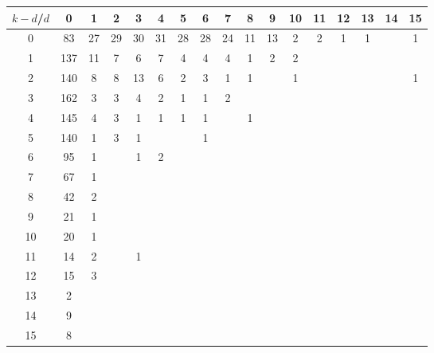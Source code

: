 \documentclass{article}
\begin{document}
\begin{table}[h]\footnotesize
{\centering
\begin{tabular}{|c|c|
c|c|c|c|c|c|c|c|c|c|c|c|c|c|c|}
  \hline
  $k-d$/$d$ 
 & 0 & 1 & 2 & 3 & 4 & 5 & 6 & 7 & 8 & 9 & 10 & 11 & 12 & 13 & 14 & 15\\

  \hline
  \hline

0  & 83 & 27 & 29 & 30 & 31 & 28 & 28 & 24 & 11 & 13 & 2 & 2 & 1 & 1 &  & 1\\

1  & 137 & 11 & 7 & 6 & 7 & 4 & 4 & 4 & 1 & 2 & 2 &  &  &  &  & \\

2  & 140 & 8 & 8 & 13 & 6 & 2 & 3 & 1 & 1 &  & 1 &  &  &  &  & 1\\

3  & 162 & 3 & 3 & 4 & 2 & 1 & 1 & 2 &  &  &  &  &  &  &  & \\

4  & 145 & 4 & 3 & 1 & 1 & 1 & 1 &  & 1 &  &  &  &  &  &  & \\

5  & 140 & 1 & 3 & 1 &  &  & 1 &  &  &  &  &  &  &  &  & \\

6  & 95 & 1 &  & 1 & 2 &  &  &  &  &  &  &  &  &  &  & \\

7  & 67 & 1 &  &  &  &  &  &  &  &  &  &  &  &  &  & \\

8  & 42 & 2 &  &  &  &  &  &  &  &  &  &  &  &  &  & \\

9  & 21 & 1 &  &  &  &  &  &  &  &  &  &  &  &  &  & \\

10  & 20 & 1 &  &  &  &  &  &  &  &  &  &  &  &  &  & \\

11  & 14 & 2 &  & 1 &  &  &  &  &  &  &  &  &  &  &  & \\

12  & 15 & 3 &  &  &  &  &  &  &  &  &  &  &  &  &  & \\

13  & 2 &  &  &  &  &  &  &  &  &  &  &  &  &  &  & \\

14  & 9 &  &  &  &  &  &  &  &  &  &  &  &  &  &  & \\

15  & 8 &  &  &  &  &  &  &  &  &  &  &  &  &  &  & \\


\end{tabular}}
\end{table}
\end{document}
